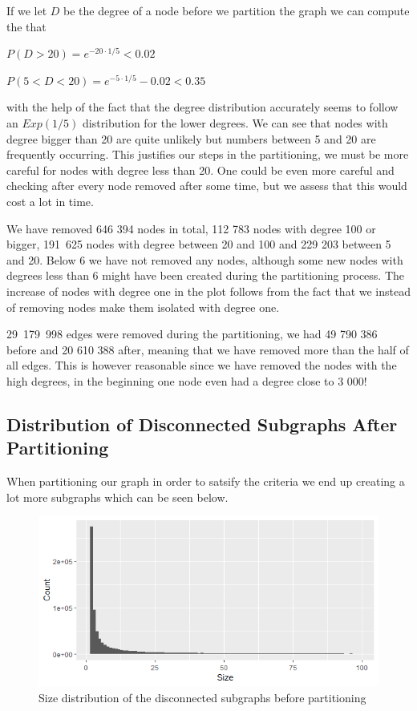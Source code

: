 \documentclass[a4paper,10pt]{article}
\begin{document}
\medskip 

If we let $D$ be the degree of a node before we partition the graph we can compute the that

$P(D>20)=e^{-20\cdot 1/5}<0.02$

$P(5<D<20)=e^{-5 \cdot 1/5}-0.02<0.35$

with the help of the fact that the degree distribution accurately seems to follow an $Exp(1/5)$ distribution for the lower degrees. We can see that nodes with degree bigger than 20 are quite unlikely but numbers between 5 and 20 are frequently occurring. This justifies our steps in the partitioning, we must be more careful for nodes with degree less than 20. One could be even more careful and checking after every node removed after some time, but we assess that this would cost a lot in time. 

\medskip

We have removed 646 394 nodes in total, 112 783 nodes with degree 100 or bigger, 191 625‬ nodes with degree between 20 and 100 and 229 203 between 5 and 20. Below 6 we have not removed any nodes, although some new nodes with degrees less than 6 might have been created during the partitioning process. The increase of nodes with degree one in the plot follows from the fact that we instead of removing nodes make them isolated with degree one.

\medskip

29 179 998 edges were removed during the partitioning, we had 49 790 386 before and 20 610 388 after, meaning that we have removed more than the half of all edges. This is however reasonable since we have removed the nodes with the high degrees, in the beginning one node even had a degree close to 3 000! 

\subsection{Distribution of Disconnected Subgraphs After Partitioning}

When partitioning our graph in order to satsify the criteria we end up creating a lot more subgraphs which can be seen below.

\begin{figure}[H]
	\centering
	\includegraphics[width=0.85\linewidth]{sizesafter.png}
	\caption{Size distribution of the disconnected subgraphs before partitioning}
	\label{fig:sizeafter}
\end{figure}
\end{document}
